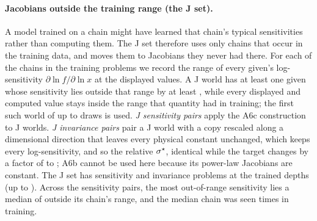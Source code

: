 \paragraph{Jacobians outside the training range (the J set).}
A model trained on a chain might have learned that chain's typical sensitivities rather than computing them.
The J set therefore uses only chains that occur in the training data, and moves them to Jacobians they never had
there.
For each of the  chains in the  training problems we record the range of every
given's log-sensitivity $\partial\ln f/\partial\ln x$ at the displayed values.
A J world has at least one given whose sensitivity lies outside that range by at least , while every
displayed and computed value stays inside the range that quantity had in training; the first such world of up to
 draws is used.
\emph{J sensitivity pairs} apply the A6c construction to J worlds.
\emph{J invariance pairs} pair a J world with a copy rescaled along a dimensional direction that leaves every
physical constant unchanged, which keeps every log-sensitivity, and so the relative $\sigma^{\star}$, identical while the
target changes by a factor of  to ; A6b cannot be used here because its power-law
Jacobians are constant.
The J set has  sensitivity and  invariance problems at the trained depths
(up to ). Across the sensitivity pairs, the most out-of-range sensitivity lies a median of
 outside its chain's range, and the median chain was seen  times in training.


